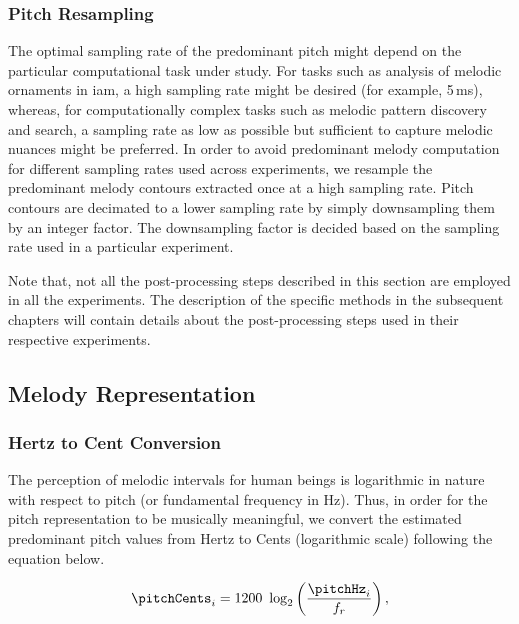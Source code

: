 {\subsubsection{Pitch Resampling}
\label{sec:data_processing_pitch_resampling}

The optimal sampling rate of the predominant pitch might depend on the particular computational task under study. For tasks such as analysis of melodic ornaments in \gls{iam}, a high sampling rate might be desired (for example, 5\,ms), whereas, for computationally complex tasks such as melodic pattern discovery and search, a sampling rate as low as possible but sufficient to capture melodic nuances might be preferred. In order to avoid predominant melody computation for different sampling rates used across experiments, we resample the predominant melody contours extracted once at a high sampling rate. Pitch contours are decimated to a lower sampling rate by simply downsampling them by an integer factor. The downsampling factor is decided based on the sampling rate used in a particular experiment.

Note that, not all the post-processing steps described in this section are employed in all the experiments. The description of the specific methods in the subsequent chapters will contain details about the post-processing steps used in their respective experiments.


\subsection{Melody Representation} 
\label{sec:pre_processing_melody_representation}

\subsubsection{Hertz to Cent Conversion}
\label{sec:data_processing_cent_conversion}

The perception of melodic intervals for human beings is logarithmic in nature with respect to pitch (or fundamental frequency in Hz). Thus, in order for the pitch representation to be musically meaningful, we convert the estimated predominant pitch values from Hertz to Cents (logarithmic scale) following the equation below.

\begin{equation}
\label{eq:hertz_to_cent_conversion}	
\pitchCents_i = 1200~\log_2\left(\frac{\pitchHz_i}{f_r}\right) ,
\end{equation}

}
